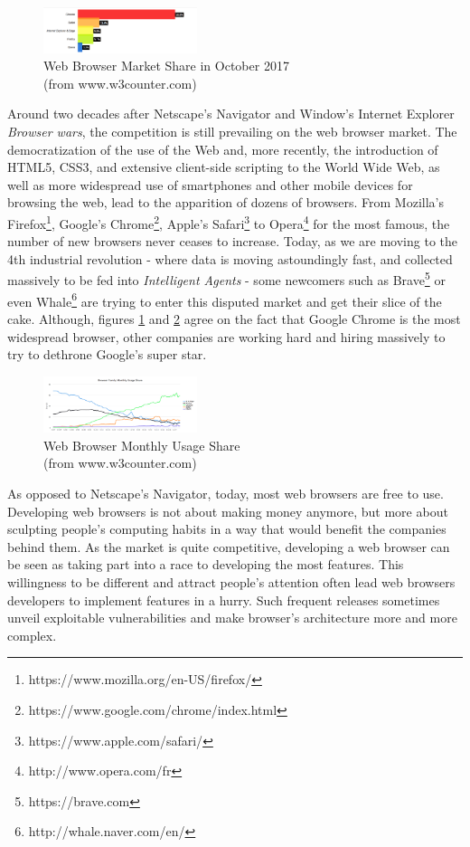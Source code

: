 \documentclass[journal]{IEEEtran}
\begin{document}
\begin{figure}[h]
\includegraphics[width=0.4\textwidth]{images/WebBrowserMarketShare.png}
\caption{Web Browser Market Share in October 2017 \\ (from www.w3counter.com)}
\label{fig:marketShare}
\end{figure}

Around two decades after Netscape's Navigator and Window's Internet Explorer \emph{Browser wars}, the competition is still prevailing on the web browser market. The democratization of the use of the Web and, more recently, the introduction of HTML5, CSS3, and extensive client-side scripting to the World Wide Web, as well as more widespread use of smartphones and other mobile devices for browsing the web, lead to the apparition of dozens of browsers. From Mozilla's Firefox\footnote{https://www.mozilla.org/en-US/firefox/}, Google's Chrome\footnote{https://www.google.com/chrome/index.html}, Apple's Safari\footnote{https://www.apple.com/safari/} to Opera\footnote{http://www.opera.com/fr} for the most famous, the number of new browsers never ceases to increase. Today, as we are moving to the 4th industrial revolution - where data is moving astoundingly fast, and collected massively to be fed into \emph{Intelligent Agents} - some newcomers such as Brave\footnote{https://brave.com} or even Whale\footnote{http://whale.naver.com/en/} are trying to enter this disputed market and get their slice of the cake.
Although, figures \ref{fig:marketShare} and \ref{fig:monthlyUsage} agree on the fact that Google Chrome is the most widespread browser, other companies are working hard and hiring massively to try to dethrone Google's super star.

\begin{figure}[h]
\centering
\includegraphics[width=0.4\textwidth]{images/BrowserFamilyMonthlyUsageShare.png}
\caption{Web Browser Monthly Usage Share \\ (from www.w3counter.com)}
\label{fig:monthlyUsage}
\end{figure}


As opposed to Netscape's Navigator, today, most web browsers are free to use. Developing web browsers is not about making money anymore, but more about sculpting people's computing habits in a way that would benefit the companies behind them.
As the market is quite competitive, developing a web browser can be seen as taking part into a race to developing the most features. This willingness to be different and attract people's attention often lead web browsers developers to implement features in a hurry. Such frequent releases sometimes unveil exploitable vulnerabilities and make browser's architecture more and more complex.
\end{document}
